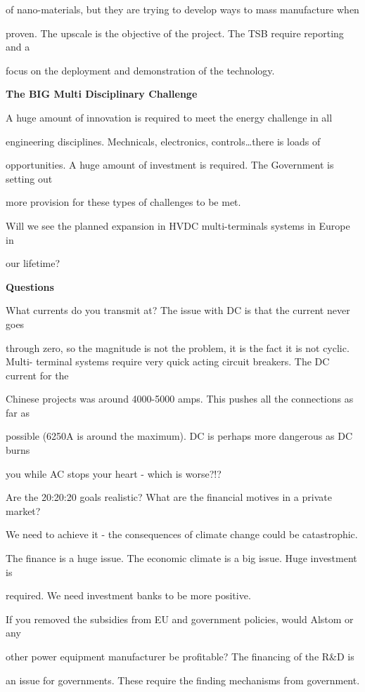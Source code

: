 of nano-materials, but they are trying to develop ways to mass manufacture when 

proven. The upscale is the objective of the project. The TSB require reporting and a 

focus on the deployment and demonstration of the technology.

\textbf{The BIG Multi Disciplinary Challenge}

A huge amount of innovation is required to meet the energy challenge in all 

engineering disciplines. Mechnicals, electronics, controls\dots there is loads of 

opportunities. A huge amount of investment is required. The Government is setting out 

more provision for these types of challenges to be met.

Will we see the planned expansion in HVDC multi-terminals systems in Europe in 

our lifetime?

\textbf{Questions}

What currents do you transmit at? The issue with DC is that the current never goes 

through zero, so the magnitude is not the problem, it is the fact it is not cyclic. Multi-
terminal systems require very quick acting circuit breakers. The DC current for the 

Chinese projects was around 4000-5000 amps. This pushes all the connections as far as 

possible (6250A is around the maximum). DC is perhaps more dangerous as DC burns 

you while AC stops your heart - which is worse?!?

Are the 20:20:20 goals realistic? What are the financial motives in a private market? 

We need to achieve it - the consequences of climate change could be catastrophic. 

The finance is a huge issue. The economic climate is a big issue. Huge investment is 

required. We need investment banks to be more positive.

If you removed the subsidies from EU and government policies, would Alstom or any 

other power equipment manufacturer be profitable? The financing of the R\&D is 

an issue for governments. These require the finding mechanisms from government. 

